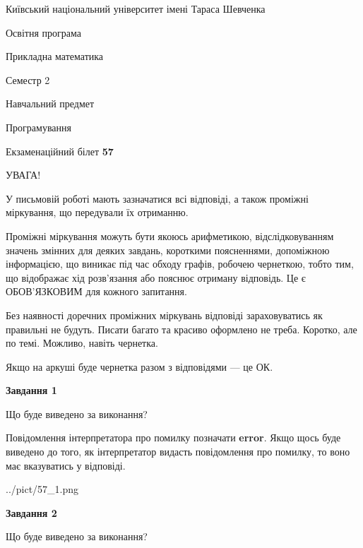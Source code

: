\documentclass[12pt, ukrainian]{article}
\begin{document}
{{\begin {small}\par
{ \center  Київський національний університет імені Тараса Шевченка \par}
{\parbox {5 cm}{Освітня програма \hfill}{\parbox {7 cm}{Прикладна математика \hfill}}\parbox {6 cm}{\hfill Семестр 2}}\par
{\parbox {5 cm} {Навчальний предмет \hfill}\parbox {7 cm}{Програмування \hfill}\parbox {6cm}{\hfill}\par}\vspace{-7pt} \end{small}}{\center Екзаменаційний білет \No \textbf
{ 57 }\par}}
{
\begin {large}
УВАГА!

У письмовій роботі мають зазначатися всі відповіді, а також проміжні міркування, що передували їх отриманню.

Проміжні міркування можуть бути якоюсь арифметикою, відслідковуванням зна\-чень змінних для деяких завдань,
короткими поясненнями, допоміжною інформацією, що виникає під час обходу графів, робочею чернеткою,
тобто тим, що відображає хід розв’язання або пояснює отриману відповідь.
Це є ОБОВ’ЯЗКОВИМ для кожного запитання.

Без наявності доречних проміжних міркувань відповіді зараховуватись як правиль\-ні не будуть.
Писати багато та красиво оформлено не треба. Коротко, але по темі. Можли\-во, навіть чернетка.

Якщо на аркуші буде чернетка разом з відповідями --- це ОК.

\newpage

{\begin {center}\textbf{Завдання 1}\end {center}}\par
Що буде виведено за виконання?

Повідомлення інтерпретатора про помилку позначати \textbf{error}.
Якщо щось буде виведено до того, як інтерпретатор видасть повідомлення про помилку, 
то воно має вказуватись у відповіді. \par


\begin{center}
	{../pict/57_1.png}
\end{center}
\newpage

{\begin {center}\textbf{Завдання 2}\end {center}}\par
Що буде виведено за виконання?


\end{large}}
\end{document}

